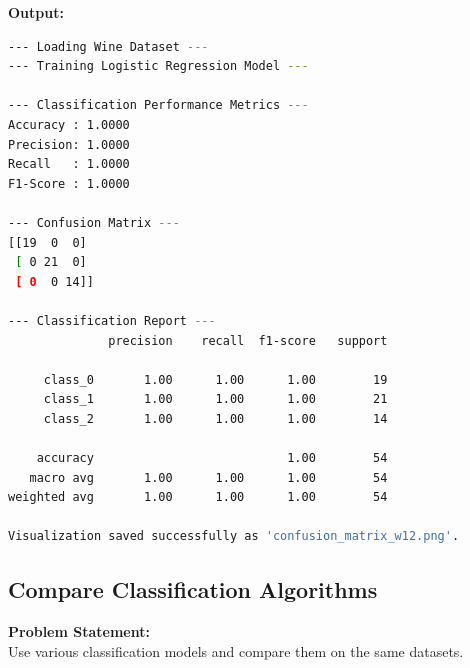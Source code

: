 \documentclass[a4paper,12pt]{article}
\begin{document}
\vspace{0.5cm}
\textbf{Output:}
\begin{lstlisting}[language=bash]
--- Loading Wine Dataset ---
--- Training Logistic Regression Model ---

--- Classification Performance Metrics ---
Accuracy : 1.0000
Precision: 1.0000
Recall   : 1.0000
F1-Score : 1.0000

--- Confusion Matrix ---
[[19  0  0]
 [ 0 21  0]
 [ 0  0 14]]

--- Classification Report ---
              precision    recall  f1-score   support

     class_0       1.00      1.00      1.00        19
     class_1       1.00      1.00      1.00        21
     class_2       1.00      1.00      1.00        14

    accuracy                           1.00        54
   macro avg       1.00      1.00      1.00        54
weighted avg       1.00      1.00      1.00        54

Visualization saved successfully as 'confusion_matrix_w12.png'.
\end{lstlisting}

\subsection{Compare Classification Algorithms}
\textbf{Problem Statement:} \\
Use various classification models and compare them on the same datasets.
\end{document}
